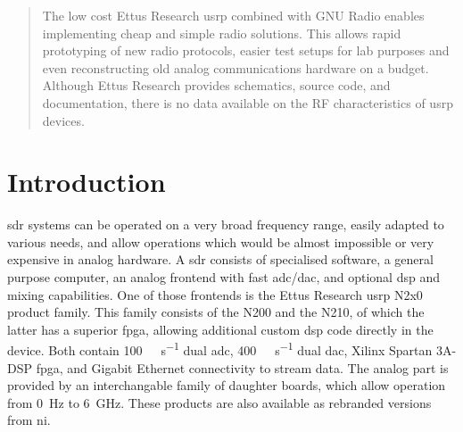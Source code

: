 \documentclass[12pt,a4paper,parskip=full]{scrartcl}
\begin{document}
\tableofcontents

\begin{abstract}
    The low cost Ettus Research \gls{usrp} 
    combined with GNU Radio enables implementing cheap and simple radio solutions.
    This allows rapid prototyping of new radio protocols, easier test setups for
    lab purposes and even reconstructing old analog communications hardware on a
    budget. Although Ettus Research provides schematics, source code, and documentation,
    there is no data available on the RF characteristics of \gls{usrp} devices.
\end{abstract}

\section{Introduction}
\Gls{sdr} systems can be operated on a very broad frequency range,
easily adapted to various needs, and allow operations which would be almost
impossible or very expensive in analog hardware. A \gls{sdr} consists of specialised
software, a general purpose computer, an analog frontend with fast
\gls{adc}/\gls{dac}, and optional \gls{dsp} and mixing capabilities. One of those frontends is
the Ettus Research \gls{usrp} N2x0 product family. This family consists of the N200 and
the N210, of which the latter has a superior \gls{fpga}, allowing additional custom \gls{dsp} code directly
in the device. Both contain \SI{100}{\mega\samples\per\second} dual \gls{adc},
\SI{400}{\mega\samples\per\second} dual \gls{dac}, Xilinx Spartan
3A-DSP \gls{fpga}, and Gigabit Ethernet connectivity to stream data. The analog part is
provided by an interchangable family of daughter boards, which allow operation from
\SI{0}{\hertz} to \SI{6}{\giga\hertz}\cite{ettus_n2x0}. These products are also available as rebranded
versions from \gls{ni}.
\end{document}
